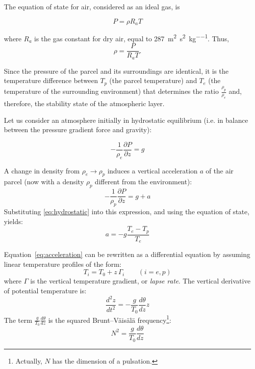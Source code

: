     The equation of state for air, considered as an ideal gas, is

    \begin{equation}
        P = \rho R_a T
    \end{equation}

    where \( R_a \) is the gas constant for dry air, equal to \SI{287}{\square\meter\per\square\second\per\kilogram}.
    Thus, 
    \begin{equation}
        \rho = \frac{P}{R_a T}.
    \end{equation}

    Since the pressure of the parcel and its surroundings are identical, it is the temperature difference between $T_p$ (the parcel temperature) and $T_e$ (the temperature of the surrounding environment) that determines the ratio $\frac{\rho_p}{\rho_e}$ and, therefore, the stability state of the atmospheric layer.
    
    Let us consider an atmosphere initially in hydrostatic equilibrium (i.e. in balance between the pressure gradient force and gravity):

    \begin{equation}
        -\frac{1}{\rho_e} \frac{\partial P}{\partial z} = g
        \label{eq:hydrostatic}
    \end{equation}

    A change in density from \(\rho_e \to \rho_p\) induces a vertical acceleration \(a\) of the air parcel (now with a density \(\rho_p\) different from the environment):
    \begin{equation}
        -\frac{1}{\rho_p} \frac{\partial P}{\partial z} = g + a
    \end{equation}
    Substituting \cref{eq:hydrostatic} into this expression, and using the equation of state, yields:
    \begin{equation}
    a = -g \frac{T_e - T_p}{T_e}
    \label{eq:acceleration}
    \end{equation}
    
    Equation~\eqref{eq:acceleration} can be rewritten as a differential equation by assuming linear temperature profiles of the form:
    \begin{equation}
    T_i = T_0 + z\,\Gamma_i \quad\quad (i = e, p)
    \end{equation}
    where $\Gamma$ is the vertical temperature gradient, or \textit{lapse rate}. The vertical derivative of potential temperature is:
    \begin{equation}
    \frac{d^2 z}{dt^2} = - \frac{g}{T_0} \frac{d\theta}{dz} z
    \end{equation}
    The term $\frac{g}{T_0} \frac{d\theta}{dz}$ is the squared Brunt–Väisälä frequency\footnote{Actually, $N$ has the dimension of a pulsation.}:
   \begin{equation}
    N^2 = \frac{g}{T_0} \frac{d\theta}{dz}
    \end{equation}
    
